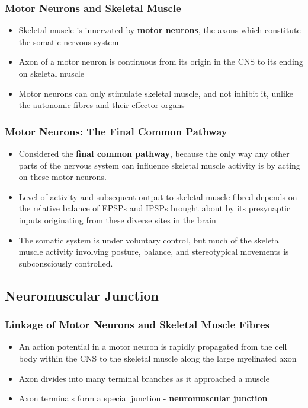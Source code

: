 \documentclass[11pt]{article}
\begin{document}
\subsubsection{Motor Neurons and Skeletal Muscle}
\begin{itemize}
\item Skeletal muscle is innervated by\textbf{ motor neurons}, the axons which constitute the somatic nervous system
\item Axon of a motor neuron is continuous from its origin in the CNS to its ending on skeletal muscle
\item Motor neurons can only stimulate skeletal muscle, and not inhibit it, unlike the autonomic fibres and their effector organs
\end{itemize}
\subsubsection{Motor Neurons: The Final Common Pathway}
\begin{itemize}
\item Considered the\textbf{ final common pathway}, because the only way any other parts of the nervous system can influence skeletal muscle activity is by acting on these motor neurons.
\item Level of activity and subsequent output to skeletal muscle fibred depends on the relative balance of EPSPs and IPSPs brought about by its presynaptic inputs originating from these diverse sites in the brain
\item The somatic system is under voluntary control, but much of the skeletal muscle activity involving posture, balance, and stereotypical movements is subconsciously controlled.
\end{itemize}



\subsection{Neuromuscular Junction}
\subsubsection{Linkage of Motor Neurons and Skeletal Muscle Fibres}
\begin{itemize}
\item An action potential in a motor neuron is rapidly propagated from the cell body within the CNS to the skeletal muscle along the large myelinated axon 
\item Axon divides into many terminal branches as it approached a muscle
\item  Axon terminals form a special junction -  \textbf{neuromuscular junction}
\end{itemize}
\end{document}
